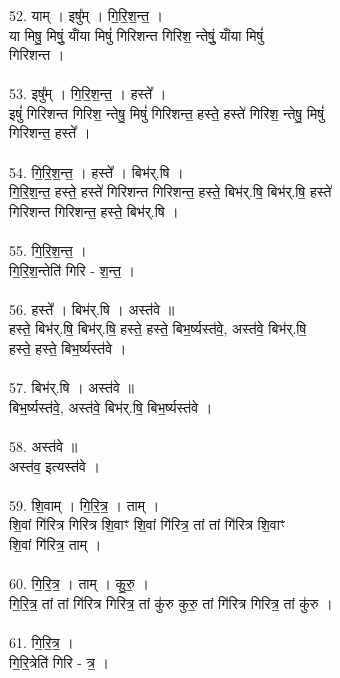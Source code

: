 \subsubsection{}
52. याम् । इषु᳚म् । गि॒रि॒श॒न्त॒ ।\\
या मिषु॒ मिषुं॒ यांँया मिषुं॑ गिरिशन्त गिरिश॒ न्तेषुं॒ यांँया मिषुं॑\\
गिरिशन्त ।\\
\\
53. इषु᳚म् । गि॒रि॒श॒न्त॒ । हस्ते᳚ ।\\
इषुं॑ गिरिशन्त गिरिश॒ न्तेषु॒ मिषुं॑ गिरिशन्त॒ हस्ते॒ हस्ते॑ गिरिश॒ न्तेषु॒ मिषुं॑\\
गिरिशन्त॒ हस्ते᳚ ।\\
\\
54. गि॒रि॒श॒न्त॒ । हस्ते᳚ । बिभ॑र्.षि ।\\
गि॒रि॒श॒न्त॒ हस्ते॒ हस्ते॑ गिरिशन्त गिरिशन्त॒ हस्ते॒ बिभ॑र्.षि॒ बिभ॑र्.षि॒ हस्ते॑\\
गिरिशन्त गिरिशन्त॒ हस्ते॒ बिभ॑र्.षि ।\\
\\
55. गि॒रि॒श॒न्त॒ ।\\
गि॒रि॒श॒न्तेति॑ गिरि - श॒न्त॒ ।\\
\\
56. हस्ते᳚ । बिभ॑र्.षि । अस्त॑वे ॥\\
हस्ते॒ बिभ॑र्.षि॒ बिभ॑र्.षि॒ हस्ते॒ हस्ते॒ बिभ॒र्ष्यस्त॑वे॒, अस्त॑वे॒ बिभ॑र्.षि॒\\
हस्ते॒ हस्ते॒ बिभ॒र्ष्यस्त॑वे ।\\
\\
57. बिभ॑र्.षि । अस्त॑वे ॥\\
बिभ॒र्ष्यस्त॑वे॒, अस्त॑वे॒ बिभ॑र्.षि॒ बिभ॒र्ष्यस्त॑वे ।\\
\\
58. अस्त॑वे ॥\\
अस्त॑व॒ इत्यस्त॑वे ।\\
\\
59. शि॒वाम् । गि॒रि॒त्र॒ । ताम् ।\\
शि॒वां गि॑रित्र गिरित्र शि॒वाꣳ शि॒वां गि॑रित्र॒ तां तां गि॑रित्र शि॒वाꣳ\\
शि॒वां गि॑रित्र॒ ताम् ।\\
\\
60. गि॒रि॒त्र॒ । ताम् । कु॒रु॒ ।\\
गि॒रि॒त्र॒ तां तां गि॑रित्र गिरित्र॒ तां कु॑रु कुरु॒ तां गि॑रित्र गिरित्र॒ तां कु॑रु ।\\
\\
61. गि॒रि॒त्र॒ ।\\
गि॒रि॒त्रेति॑ गिरि - त्र॒ ।\\
